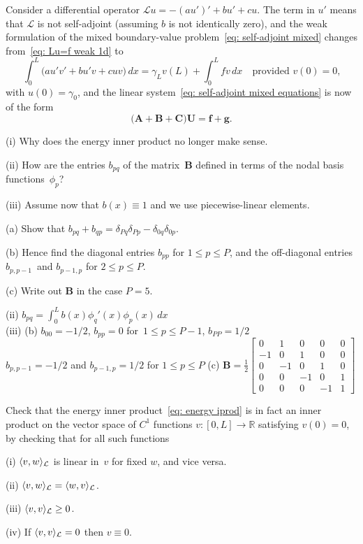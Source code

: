 \begin{Exercises}
\exercise
Consider a differential operator $\mathcal{L}u=-(au')'+bu'+cu$.  The term in 
$u'$ means that $\mathcal{L}$ is not self-adjoint (assuming $b$ is not 
identically zero), and the weak formulation of the mixed boundary-value 
problem~\eqref{eq: self-adjoint mixed} changes from~\eqref{eq: Lu=f weak 1d} to
\[
\int_0^L\bigl(au'v'+bu'v+cuv\bigr)\,dx
    =\gamma_Lv(L)+\int_0^Lfv\,dx\quad\text{provided $v(0)=0$,}
\]
with $u(0)=\gamma_0$, and the linear 
system~\eqref{eq: self-adjoint mixed equations} is now of the form
\[
\bigl(\boldsymbol{A}+\boldsymbol{B}+\boldsymbol{C}\bigr)\boldsymbol{U}
    =\boldsymbol{f}+\boldsymbol{g}.
\]
\begin{description}
\item{(i)} Why does the energy inner product no longer make sense.
\item{(ii)} How are the entries $b_{pq}$ of the matrix~$\boldsymbol{B}$ defined 
in terms of the nodal basis functions~$\phi_p$?
\item{(iii)} Assume now that $b(x)\equiv1$ and we use piecewise-linear elements.
\begin{description}
\item{(a)} Show that 
$b_{pq}+b_{qp}=\delta_{Pq}\delta_{Pp}-\delta_{0q}\delta_{0p}$.
\item{(b)} Hence find the diagonal entries $b_{pp}$ for $1\le p\le P$, and
the off-diagonal entries $b_{p,p-1}$~and $b_{p-1,p}$ for $2\le p\le P$.
\item{(c)} Write out $\boldsymbol{B}$ in the case $P=5$.
\end{description}
\end{description}
\begin{ans}
(ii) $b_{pq}=\int_0^Lb(x)\phi_q'(x)\phi_p(x)\,dx$\\
(iii) (b) $b_{00}=-1/2$, $b_{pp}=0$ for~$1\le p\le P-1$, $b_{PP}=1/2$\\
$b_{p,p-1}=-1/2$ and $b_{p-1,p}=1/2$ for $1\le p\le P$
(c) $\boldsymbol{B}=\frac{1}{2}\begin{bmatrix}
 0& 1& 0& 0&0\\
-1& 0& 1& 0&0\\
 0&-1& 0& 1&0\\
 0& 0&-1& 0&1\\
 0& 0& 0&-1&1\end{bmatrix}$
\end{ans}


\exercise
Check that the energy inner product~\eqref{eq: energy iprod} is in fact an 
inner product on the vector space of $C^1$ functions $v:[0,L]\to\mathbb{R}$ 
satisfying $v(0)=0$, by checking that for all such functions
\begin{description}
\item{(i)} $\langle v,w\rangle_{\mathcal{L}}$ is linear in~$v$ for fixed $w$, and
vice versa.
\item{(ii)} $\langle v,w\rangle_{\mathcal{L}}=\langle w,v\rangle_{\mathcal{L}}$.
\item{(iii)} $\langle v,v\rangle_{\mathcal{L}}\ge0$.
\item{(iv)} If $\langle v,v\rangle_{\mathcal{L}}=0$ then $v\equiv0$.
\end{description}


\end{Exercises}
